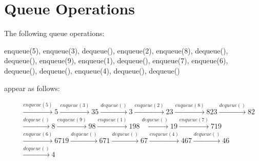 \documentclass[a4paper]{article}
\begin{document}
\section{Queue Operations}
The following queue operations:

enqueue(5), enqueue(3), dequeue(), enqueue(2), enqueue(8), dequeue(), dequeue(), enqueue(9), enqueue(1), dequeue(), enqueue(7), enqueue(6), dequeue(), dequeue(), enqueue(4), dequeue(), dequeue()

appear as follows:

\begin{align*}
\boxed{\phantom{5}}&\xrightarrow{enqueue(5)}\boxed{5}\xrightarrow{enqueue(3)}\boxed{3}\boxed{5}\xrightarrow{dequeue()}\boxed{3}\xrightarrow{enqueue(2)}\boxed{2}\boxed{3}\xrightarrow{enqueue(8)}\boxed{8}\boxed{2}\boxed{3}\xrightarrow{dequeue()}\boxed{8}\boxed{2}\\&\xrightarrow{dequeue()}\boxed{8}\xrightarrow{enqueue(9)}\boxed{9}\boxed{8}\xrightarrow{enqueue(1)}\boxed{1}\boxed{9}\boxed{8}\xrightarrow{dequeue()}\boxed{1}\boxed{9}\xrightarrow{enqueue(7)}\boxed{7}\boxed{1}\boxed{9}\\&\xrightarrow{enqueue(6)}\boxed{6}\boxed{7}\boxed{1}\boxed{9}\xrightarrow{dequeue()}\boxed{6}\boxed{7}\boxed{1}\xrightarrow{dequeue()}\boxed{6}\boxed{7}\xrightarrow{enqueue(4)}\boxed{4}\boxed{6}\boxed{7}\xrightarrow{dequeue()}\boxed{4}\boxed{6}\\&\xrightarrow{dequeue()}\boxed{4}
\end{align*}
\end{document}
